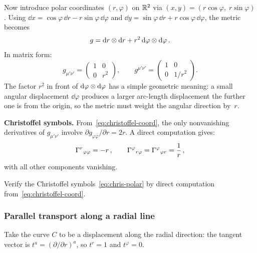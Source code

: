 \begin{example}%
\label{ex:R2-polar}
  Now introduce polar coordinates $(r,\varphi)$ on $\mathbb{R}^{2}$
  via $(x,y) = (r\cos\varphi,\; r\sin\varphi)$.
  Using $\dd x = \cos\varphi\,\dd r - r\sin\varphi\,\dd\varphi$
  and $\dd y = \sin\varphi\,\dd r + r\cos\varphi\,\dd\varphi$,
  the metric becomes
  \begin{equation}\label{eq:polar-metric}
    g = \mathrm{d} r\otimes\mathrm{d} r + r^2\,\mathrm{d}\varphi\otimes\mathrm{d}\varphi\,.
  \end{equation}
  In matrix form:
  \[
    g_{\mu'\nu'}
      = \begin{pmatrix} 1 & 0 \\ 0 & r^2 \end{pmatrix},
    \qquad
    g^{\mu'\nu'}
      = \begin{pmatrix} 1 & 0 \\ 0 & 1/r^2 \end{pmatrix}.
  \]
  The factor $r^2$ in front of $\mathrm{d}\varphi\otimes\mathrm{d}\varphi$ has a
  simple geometric meaning: a small angular displacement
  $\dd\varphi$ produces a larger arc-length displacement the
  further one is from the origin, so the metric must weight the
  angular direction by~$r$.

  \noindent\textbf{Christoffel symbols.}\;
  From~\eqref{eq:christoffel-coord}, the only nonvanishing
  derivatives of $g_{\mu'\nu'}$ involve
  $\partial g_{\varphi\varphi}/\partial r = 2r$.
  A direct computation gives:
  \begin{equation}\label{eq:chris-polar}
    \Gamma^{r}{}_{\varphi\varphi} = -r\,,
    \qquad
    \Gamma^{\varphi}{}_{r\varphi}
      = \Gamma^{\varphi}{}_{\varphi r}
      = \frac{1}{r}\,,
  \end{equation}
  with all other components vanishing.
\end{example}

\begin{exercise}\label{ex:chris-polar}
  Verify the Christoffel
  symbols~\eqref{eq:chris-polar} by direct computation
  from~\eqref{eq:christoffel-coord}.
\end{exercise}

\subsubsection{Parallel transport along a radial line}%
\label{sec:radial-transport}

Take the curve $C$ to be a displacement along the radial
direction: the tangent vector is
$t^a = (\partial/\partial r)^a$, so $t^r = 1$ and
$t^\varphi = 0$.


